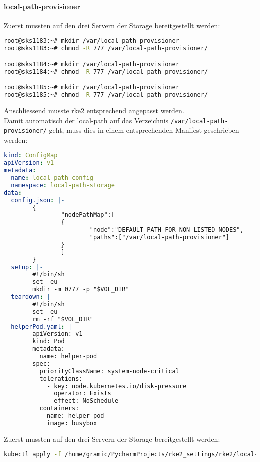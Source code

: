 \paragraph{local-path-provisioner}
Zuerst mussten auf den drei Servern der Storage bereitgestellt werden:
\lstset{style=gra_codestyle}
\begin{lstlisting}[language=bash, caption=local-path-storage auf Linux Bereitstellen,captionpos=b,label={lst:local-path-storage-provide},breaklines=true]
root@sks1183:~# mkdir /var/local-path-provisioner
root@sks1183:~# chmod -R 777 /var/local-path-provisioner/

root@sks1184:~# mkdir /var/local-path-provisioner
root@sks1184:~# chmod -R 777 /var/local-path-provisioner/

root@sks1185:~# mkdir /var/local-path-provisioner
root@sks1185:~# chmod -R 777 /var/local-path-provisioner/
\end{lstlisting}

Anschliessend musste rke2 entsprechend angepasst werden.\\
Damit automatisch der local-path auf das Verzeichnis \texttt{/var/local-path-provisioner/} geht, muss dies in einem entsprechenden Manifest geschrieben werden:
\lstset{style=gra_codestyle}
\begin{lstlisting}[language=yaml, caption=local-path-provisioner definieren,captionpos=b,label={lst:local-path-provisioner.yaml},breaklines=true]
kind: ConfigMap
apiVersion: v1
metadata:
  name: local-path-config
  namespace: local-path-storage
data:
  config.json: |-
        {
                "nodePathMap":[
                {
                        "node":"DEFAULT_PATH_FOR_NON_LISTED_NODES",
                        "paths":["/var/local-path-provisioner"]
                }
                ]
        }
  setup: |-
        #!/bin/sh
        set -eu
        mkdir -m 0777 -p "$VOL_DIR"
  teardown: |-
        #!/bin/sh
        set -eu
        rm -rf "$VOL_DIR"
  helperPod.yaml: |-
        apiVersion: v1
        kind: Pod
        metadata:
          name: helper-pod
        spec:
          priorityClassName: system-node-critical
          tolerations:
            - key: node.kubernetes.io/disk-pressure
              operator: Exists
              effect: NoSchedule
          containers:
          - name: helper-pod
            image: busybox
\end{lstlisting}

Zuerst mussten auf den drei Servern der Storage bereitgestellt werden:
\lstset{style=gra_codestyle}
\begin{lstlisting}[language=bash, caption=local-path-storage aktualisieren,captionpos=b,label={lst:local-path-storage-apply},breaklines=true]
kubectl apply -f /home/gramic/PycharmProjects/rke2_settings/rke2/local-path-provisioner.yaml
\end{lstlisting}

